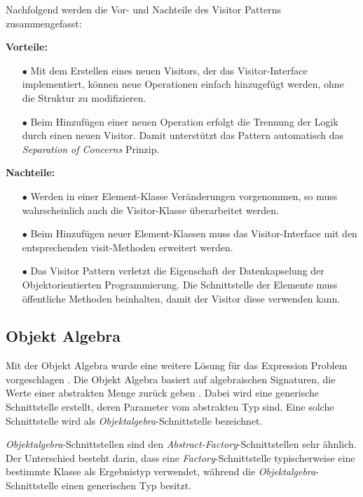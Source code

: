 \documentclass{llncs}
\begin{document}
Nachfolgend werden die Vor- und Nachteile des Visitor Patterns zusammengefasst: \linebreak

\textbf{Vorteile:}
\begin{itemize}
	\item[$\bullet$] Mit dem Erstellen eines neuen Visitors, der das Visitor-Interface implementiert, können neue Operationen einfach hinzugefügt werden, ohne die Struktur zu modifizieren.
	\item[$\bullet$] Beim Hinzufügen einer neuen Operation erfolgt die Trennung der Logik durch einen neuen Visitor. Damit unterstützt das Pattern automatisch das \textit{Separation of Concerns} Prinzip.
\end{itemize}

\textbf{Nachteile:}
\begin{itemize}
	\item[$\bullet$] Werden in einer Element-Klasse Veränderungen vorgenommen, so muss wahrscheinlich auch die Visitor-Klasse überarbeitet werden.
	\item[$\bullet$] Beim Hinzufügen neuer Element-Klassen muss das Visitor-Interface mit den entsprechenden visit-Methoden erweitert werden.
	\item[$\bullet$] Das Visitor Pattern verletzt die Eigenschaft der Datenkapselung der Objektorientierten Programmierung. Die Schnittstelle der Elemente muss öffentliche Methoden beinhalten, damit der Visitor diese verwenden kann.
\end{itemize}

\subsection{Objekt Algebra} \label{sec:object-algebra}
Mit der Objekt Algebra wurde eine weitere Lösung für das Expression Problem vorgeschlagen \cite{Oliveira12}. Die Objekt Algebra basiert auf algebraischen Signaturen, die Werte einer abstrakten Menge zurück geben \cite{Guttag78}. Dabei wird eine generische Schnittstelle erstellt, deren Parameter vom abstrakten Typ sind. Eine solche Schnittstelle wird als \textit{Objektalgebra}-Schnittstelle bezeichnet.

\textit{Objektalgebra}-Schnittstellen  sind den \textit{Abstract-Factory}-Schnittstellen sehr ähnlich. Der Unterschied besteht darin, dass eine \textit{Factory}-Schnittstelle typischerweise eine bestimmte Klasse als Ergebnistyp verwendet, während die \textit{Objektalgebra}-Schnittstelle einen generischen Typ besitzt.
\end{document}
